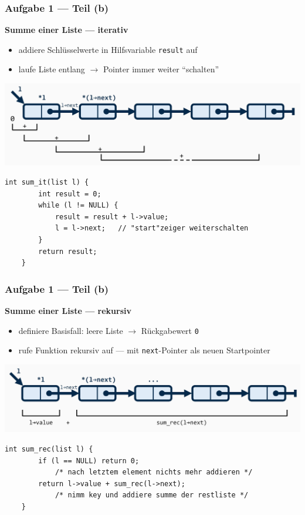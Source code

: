 \documentclass{beamer}
\newcommand*{\ttfamilywithbold}{\fontfamily{lmtt}\selectfont}
\begin{document}
\begin{frame}[fragile] \frametitle{Aufgabe 1 --- Teil (b)}
	\textbf{Summe einer Liste --- iterativ}
	\begin{itemize} \small
		\item addiere Schlüsselwerte in Hilfsvariable \texttt{result} auf
		\item laufe Liste entlang  $\to$ Pointer immer weiter \enquote{schalten}
	\end{itemize}

	\pause

	\begin{center}
		\includegraphics[width=0.7\linewidth]{tut06-graphics/tut06-summe-it}
	\end{center}

	\pause
	
	\begin{lstlisting}[style=notebook, basicstyle=\scriptsize\ttfamilywithbold]
	int sum_it(list l) {
		int result = 0;
		while (l != NULL) {
			result = result + l->value;
			l = l->next;   // "start"zeiger weiterschalten 
		}
		return result;
	}
	\end{lstlisting}
\end{frame}

\begin{frame}[fragile] \frametitle{Aufgabe 1 --- Teil (b)}
	\textbf{Summe einer Liste --- rekursiv}
	\begin{itemize}
		\item definiere Basisfall: leere Liste $\to$ Rückgabewert \texttt{0}
		\item rufe Funktion rekursiv auf --- mit \texttt{next}-Pointer als neuen Startpointer
	\end{itemize}

	\pause
	
	\begin{center}
		\includegraphics[width=0.8\linewidth]{tut06-graphics/tut06-summe-rec}
	\end{center}

	\pause
		
	\begin{lstlisting}[style=notebook]
	int sum_rec(list l) {
		if (l == NULL) return 0; 
			/* nach letztem element nichts mehr addieren */
		return l->value + sum_rec(l->next); 
			/* nimm key und addiere summe der restliste */
	}
	\end{lstlisting}
\end{frame}
\end{document}
